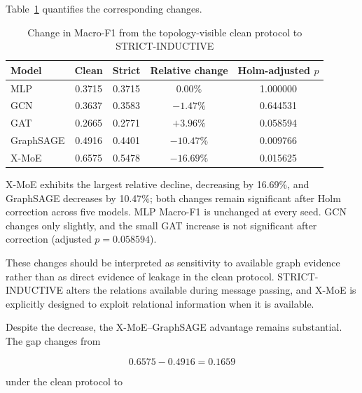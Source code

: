 \documentclass{ieeeaccess}
\begin{document}
Table~\ref{tab:clean_strict_change} quantifies the corresponding changes.

\begin{table}[t]
\centering
\caption{Change in Macro-F1 from the topology-visible clean protocol to STRICT-INDUCTIVE}
\label{tab:clean_strict_change}

\renewcommand{\arraystretch}{1.12}
\setlength{\tabcolsep}{6pt}
\scriptsize

\begin{tabular}{lcccc}
\toprule
\textbf{Model} &
\textbf{Clean} &
\textbf{Strict} &
\textbf{Relative change} &
\textbf{Holm-adjusted \(p\)} \\
\midrule

MLP &
0.3715 &
0.3715 &
$0.00\%$ &
1.000000 \\

GCN &
0.3637 &
0.3583 &
$-1.47\%$ &
0.644531 \\

GAT &
0.2665 &
0.2771 &
$+3.96\%$ &
0.058594 \\

GraphSAGE &
0.4916 &
0.4401 &
$-10.47\%$ &
0.009766 \\

X-MoE &
0.6575 &
0.5478 &
$-16.69\%$ &
0.015625 \\

\bottomrule
\end{tabular}
\end{table}

X-MoE exhibits the largest relative decline, decreasing by 16.69\%, and GraphSAGE decreases by 10.47\%; both changes remain significant after Holm correction across five models. MLP Macro-F1 is unchanged at every seed. GCN changes only slightly, and the small GAT increase is not significant after correction (adjusted \(p=0.058594\)).

These changes should be interpreted as sensitivity to available graph evidence rather than as direct evidence of leakage in the clean protocol. STRICT-INDUCTIVE alters the relations available during message passing, and X-MoE is explicitly designed to exploit relational information when it is available.

Despite the decrease, the X-MoE--GraphSAGE advantage remains substantial. The gap changes from

\begin{equation}
0.6575-0.4916=0.1659
\end{equation}

under the clean protocol to
\end{document}
